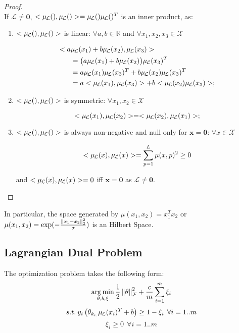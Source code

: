 \begin{proof}

~\\If $\mathcal{L} \neq \bm{0}$, $<\mul{},\mul{}> = \mul{}\mul{}^T$ is an inner product, as:

\begin{enumerate}
    
    \item $<\mul{},\mul{}>$ is linear: $ \forall a,b \in \mathbb{R}$ and $ \forall x_1,x_2,x_3 \in \mathcal{X}$

    \small{
    \begin{align*}
        <a & \mul{x_1}+b\mul{x_2},\mul{x_3}> \\
        &= \big( a\mul{x_1} + b\mul{x_2} \big)\mul{x_3}^T \\
        &= a\mul{x_1}\mul{x_3}^T + b\mul{x_2}\mul{x_3}^T \\
        &= a <\mul{x_1},\mul{x_3}> + b <\mul{x_2}\mul{x_3}>;
    \end{align*}
    }

    \item $<\mul{},\mul{}>$ is symmetric: $ \forall x_1, x_2 \in \mathcal{X}$

    $$ <\mul{x_1},\mul{x_2}> = <\mul{x_2},\mul{x_1}>;$$


    \item $<\mul{},\mul{}>$ is always non-negative and null only for $\bm{x}=\bm{0}$: $\forall x \in \mathcal{X}$

    $$<\mul{x},\mul{x}> = \sump \mu(x,p)^2 \geq 0$$ 

    and $<\mul{x},\mul{x}> = 0$ iff $\bm{x}=\bm{0}$ as $\mathcal{L} \neq \bm{0}$.

\end{enumerate}

\end{proof}

In particular, the space generated by $\mu(x_1,x_2) = x_1^Tx_2$ or $\mu(x_1,x_2) = \exp(-\frac{\left\| x_1-x_2 \right\|_2^2}{\sigma})$ is an Hilbert Space. 

\subsection{Lagrangian Dual Problem}
\label{an:dual}

The \landSVM optimization problem takes the following form:
$$ \operatorname*{arg\,min}_{\theta,b,\xi} \frac{1}{2} \left\| \theta \right\|_{\mathcal{F}}^2 + \frac{c}{m} \sum_{i=1}^m \xi_i$$
$$s.t. \: y_i \left(\theta_{k_{i.}} \mul{x_i}^T + b \right) \geq 1- \xi_i \:\: \forall i=1..m$$
$$\xi_i \geq 0 \:\: \forall i=1..m$$ \label{eq:primal}

